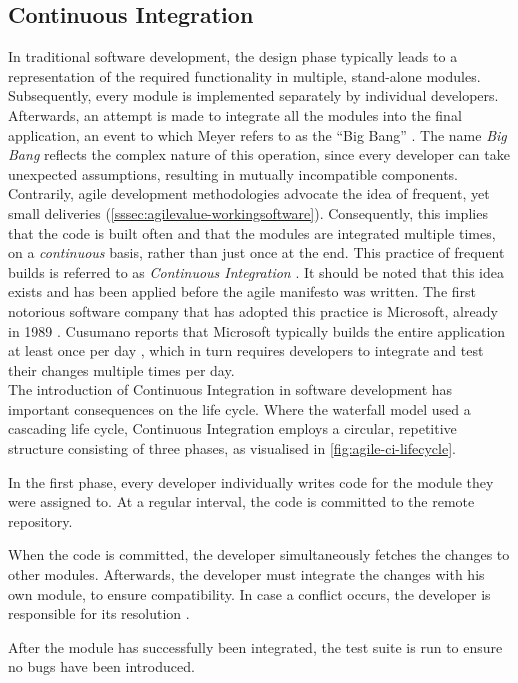 
\subsection{Continuous Integration}
In traditional software development, the design phase typically leads to a representation of the required functionality in multiple, stand-alone modules. Subsequently, every module is implemented separately by individual developers. Afterwards, an attempt is made to integrate all the modules into the final application, an event to which Meyer refers to as the ``Big Bang'' \cite[~p.103]{Meyer2014}. The name \emph{Big Bang} reflects the complex nature of this operation, since every developer can take unexpected assumptions, resulting in mutually incompatible components.\\

\noindent Contrarily, agile development methodologies advocate the idea of frequent, yet small deliveries (\autoref{sssec:agilevalue-workingsoftware}). Consequently, this implies that the code is built often and that the modules are integrated multiple times, on a \emph{continuous} basis, rather than just once at the end. This practice of frequent builds is referred to as \emph{Continuous Integration} \cite{martin2014,Meyer2014}. It should be noted that this idea exists and has been applied before the agile manifesto was written. The first notorious software company that has adopted this practice is Microsoft, already in 1989 \cite[~p.11]{cusumanomicrosoft}. Cusumano reports that Microsoft typically builds the entire application at least once per day \cite[~p.12]{cusumanomicrosoft}, which in turn requires developers to integrate and test their changes multiple times per day.\\

\noindent The introduction of Continuous Integration in software development has important consequences on the life cycle. Where the waterfall model used a cascading life cycle, Continuous Integration employs a circular, repetitive structure consisting of three phases, as visualised in \autoref{fig:agile-ci-lifecycle}.


\begin{enumerate}
	 In the first phase, every developer individually writes code for the module they were assigned to. At a regular interval, the code is committed to the remote repository.
	
	 When the code is committed, the developer simultaneously fetches the changes to other modules. Afterwards, the developer must integrate the changes with his own module, to ensure compatibility. In case a conflict occurs, the developer is responsible for its resolution \cite{martin2014}.
	
	 After the module has successfully been integrated, the test suite is run to ensure no bugs have been introduced.
\end{enumerate}

